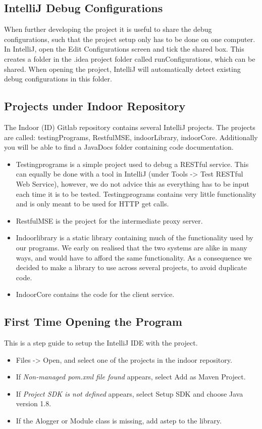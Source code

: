 \subsection{IntelliJ Debug Configurations}
When further developing the project it is useful to share the debug configurations, such that the project setup only has to be done on one computer. In IntelliJ, open the Edit Configurations screen and tick the shared box. This creates a folder in the .idea project folder called runConfigurations, which can be shared. When opening the project, IntelliJ will automatically detect existing debug configurations in this folder.

\subsection{Projects under Indoor Repository}
The Indoor (ID) Gitlab repository contains several IntelliJ projects. The projects are called: testingPrograms, RestfulMSE, indoorLibrary, indoorCore. Additionally you will be able to find a JavaDocs folder containing code documentation.

\begin{itemize}
\item Testingprograms is a simple project used to debug a RESTful service. This can equally be done with a tool in IntelliJ (under Tools -> Test RESTful Web Service), however, we do not advice this as everything has to be input each time it is to be tested. Testingprograms contains very little functionality and is only meant to be used for HTTP get calls.
\item RestfulMSE is the project for the intermediate proxy server. 
\item Indoorlibrary is a static library containing much of the functionality used by our programs. We early on realised that the two systems are alike in many ways, and would have to afford the same functionality. As a consequence we decided to make a library to use across several projects, to avoid duplicate code. 
\item IndoorCore contains the code for the client service. 
\end{itemize} 

\subsection{First Time Opening the Program}
This is a step guide to setup the IntelliJ IDE with the project.
\begin{itemize}
\item Files -> Open, and select one of the projects in the indoor repository.
\item If \emph{Non-managed pom.xml file found} appears, select Add as Maven Project.
\item If \emph{Project SDK is not defined} appears, select Setup SDK and choose Java version 1.8.
\item If the Alogger or Module class is missing, add astep to the library.
\end{itemize}
